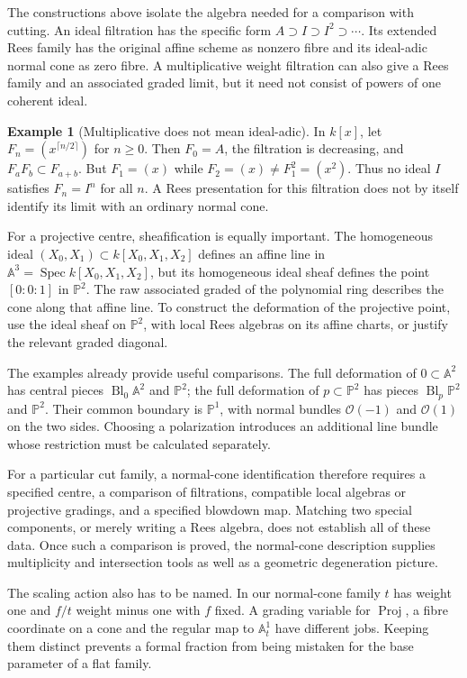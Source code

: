 \documentclass[11pt,a4paper]{article}
\numberwithin{equation}{section}
\theoremstyle{definition}
\newtheorem{example}[definition]{Example}
\newcommand{\A}{\mathbb A}
\newcommand{\PP}{\mathbb P}
\newcommand{\OO}{\mathcal O}
\newcommand{\Spec}{\operatorname{Spec}}
\newcommand{\Proj}{\operatorname{Proj}}
\newcommand{\Bl}{\operatorname{Bl}}
\begin{document}
The constructions above isolate the algebra needed for a comparison
with cutting. An ideal filtration has the specific form
$A\supset I\supset I^2\supset\cdots$. Its extended Rees family has
the original affine scheme as nonzero fibre and its ideal-adic
normal cone as zero fibre. A multiplicative weight filtration can
also give a Rees family and an associated graded limit, but it need
not consist of powers of one coherent ideal.

\begin{example}[Multiplicative does not mean ideal-adic]
In $k[x]$, let $F_n=(x^{\lceil n/2\rceil})$ for $n\ge0$.
Then $F_0=A$, the filtration is decreasing, and
$F_aF_b\subset F_{a+b}$. But $F_1=(x)$ while
$F_2=(x)\ne F_1^2=(x^2)$. Thus no ideal $I$ satisfies
$F_n=I^n$ for all $n$. A Rees presentation for this filtration
does not by itself identify its limit with an ordinary normal cone.
\end{example}

For a projective centre, sheafification is equally important. The
homogeneous ideal $(X_0,X_1)\subset k[X_0,X_1,X_2]$ defines an
affine line in $\A^3=\Spec k[X_0,X_1,X_2]$, but its homogeneous
ideal sheaf defines the point $[0:0:1]$ in $\PP^2$. The raw
associated graded of the polynomial ring describes the cone along
that affine line. To construct the deformation of the projective
point, use the ideal sheaf on $\PP^2$, with local Rees algebras
on its affine charts, or justify the relevant graded diagonal.

The examples already provide useful comparisons. The full deformation
of $0\subset\A^2$ has central pieces $\Bl_0\A^2$ and $\PP^2$;
the full deformation of $p\subset\PP^2$ has pieces
$\Bl_p\PP^2$ and $\PP^2$. Their common boundary is $\PP^1$, with
normal bundles $\OO(-1)$ and $\OO(1)$ on the two sides. Choosing a
polarization introduces an additional line bundle whose restriction
must be calculated separately.

For a particular cut family, a normal-cone identification therefore
requires a specified centre, a comparison of filtrations, compatible
local algebras or projective gradings, and a specified blowdown map.
Matching two special components, or merely writing a Rees algebra,
does not establish all of these data. Once such a comparison is
proved, the normal-cone description supplies multiplicity and
intersection tools as well as a geometric degeneration picture.

The scaling action also has to be named. In our normal-cone family
$t$ has weight one and $f/t$ weight minus one with $f$ fixed.
A grading variable for $\Proj$, a fibre coordinate on a cone and
the regular map to $\A^1_t$ have different jobs. Keeping them
distinct prevents a formal fraction from being mistaken for the
base parameter of a flat family.
\end{document}
